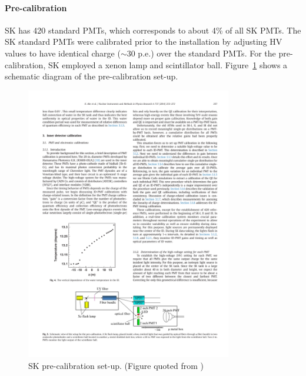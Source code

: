 \paragraph{Pre-calibration}

SK has 420 standard PMTs, which corresponds to about 4\% of all SK PMTs.
The SK standard PMTs were calibrated prior to the installation by adjusting
HV values to have identical charge ($\sim30$ p.e.) over the standard PMTs.
For the pre-calibration, SK employed a xenon lamp and scintillator ball.
Figure~\ref{fig:sk_precalib_setup} shows a schematic diagram of the pre-calibration
set-up.
\begin{figure}[htb]
  \centering
  \includegraphics[width=9cm]{figures/sk_precalib_setup.pdf}
  \caption{SK pre-calibration set-up. (Figure quoted from \cite{SK_calib_paper})}
  \label{fig:sk_precalib_setup}
\end{figure}

